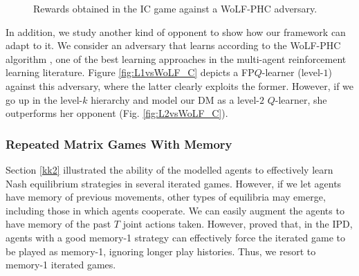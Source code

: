 \begin{figure}[!ht]%
\centering
{}%
  \caption{Rewards obtained in the IC game against a WoLF-PHC adversary. }
\end{figure}

{\color{black}
In addition, we study another kind of opponent to show how our framework
can adapt to it. We consider an adversary that learns according to the
WoLF-PHC algorithm \cite{bowling2001rational}, one of the best learning approaches in the multi-agent reinforcement learning literature. Figure \ref{fig:L1vsWoLF_C}
depicts a FP$Q$-learner (level-$1$) against this adversary, where the latter 
clearly exploits the former. However, if we go up in the level-$k$ hierarchy and model our
DM as a level-$2$ $Q$-learner, she outperforms her
opponent (Fig. \ref{fig:L2vsWoLF_C}).}



\subsubsection{Repeated Matrix Games With Memory}\label{sec:mem}

Section \ref{kk2} illustrated the ability of the modelled agents
to effectively learn Nash equilibrium strategies in several iterated games.
However, if we let agents have memory of previous movements, other types
of equilibria may emerge, including those in which agents cooperate. We can easily augment the agents to have memory of the past $T$ joint actions taken. However, \cite{press2012iterated} proved that, in the IPD, agents with a good memory-1 strategy can effectively force the iterated game to be played as memory-1, ignoring longer play histories. Thus, we resort to memory-1 iterated games.

